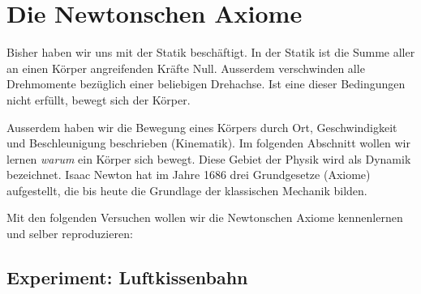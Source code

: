 \section*{Die Newtonschen Axiome}

Bisher haben wir uns mit der Statik beschäftigt. In der Statik ist die Summe aller
an einen Körper angreifenden Kräfte Null. Ausserdem verschwinden alle Drehmomente bezüglich
einer beliebigen Drehachse. Ist eine dieser Bedingungen nicht erfüllt, bewegt sich der Körper.


Ausserdem haben wir die Bewegung eines Körpers durch Ort, Geschwindigkeit und Beschleunigung
beschrieben (Kinematik). Im folgenden Abschnitt wollen wir lernen \emph{warum} ein Körper sich bewegt.
Diese Gebiet der Physik wird als Dynamik bezeichnet.
Isaac Newton hat im Jahre 1686 drei Grundgesetze (Axiome) aufgestellt, die bis heute die Grundlage
der klassischen Mechanik bilden.


Mit den folgenden Versuchen wollen wir die Newtonschen Axiome kennenlernen und
selber reproduzieren:

\subsection*{Experiment: Luftkissenbahn}

